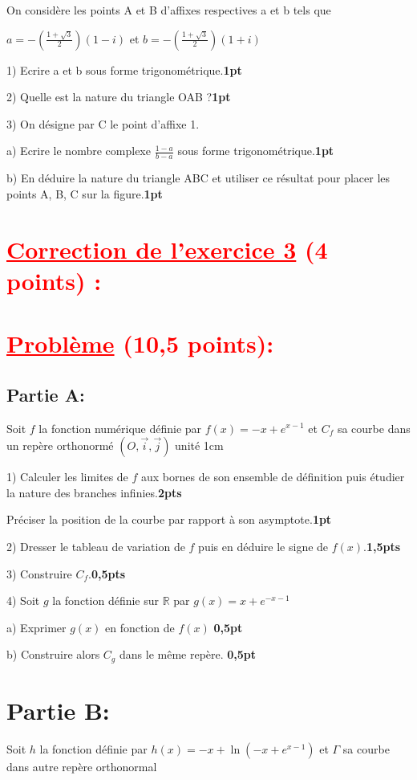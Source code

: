 \documentclass[12pt]{article}
\begin{document}
On considère les points A et B d’affixes respectives a et b tels que

$a=-(\frac{1+\sqrt{3}}{2})(1-i)$ et $b=-(\frac{1+\sqrt{3}}{2})(1+i)$ 

1) Ecrire a et b sous forme trigonométrique.\textbf{1pt}

2) Quelle est la nature du triangle OAB ?\textbf{1pt}

3) On désigne par C le point d’affixe 1.

a) Ecrire le nombre complexe $\frac{1-a}{b-a}$  sous forme trigonométrique.\textbf{1pt}

b) En déduire la nature du triangle ABC et  utiliser ce résultat pour placer les points A, B, C sur la figure.\textbf{1pt}
\section*{\textcolor{red}{\underline{Correction de l'exercice 3} (4 points) :}}
\section*{\textcolor{red}{\underline{Problème} (10,5 points):}}
\subsection*{Partie A:}
Soit $f$ la fonction numérique définie par $f(x)=-x+e^{x-1}$  et $C_{f}$ sa courbe dans un repère orthonormé $(O,\vec{i},\vec{j})$ unité 1cm

1) Calculer les limites de $f$ aux bornes de son ensemble de définition puis étudier la nature des branches infinies.\textbf{2pts}

Préciser la position de la courbe par rapport à son asymptote.\textbf{1pt}

2) Dresser le tableau de variation de $f$ puis en déduire le signe de $f(x)$.\textbf{1,5pts}

3) Construire $C_{f}$.\textbf{0,5pts}

4) Soit $g$ la fonction définie sur $\mathbb{R}$ par $g(x)=x+e^{-x-1}$

  a) Exprimer $g(x)$ en fonction de $f(x)$ \textbf{0,5pt}
  
  b) Construire alors $C_{g}$ dans le même repère.  \textbf{0,5pt}
\section*{Partie B:}
Soit $h$ la fonction définie par $h(x)=-x+\ln(-x+e^{x-1})$  et $\Gamma$ sa courbe dans autre repère orthonormal
\end{document}

